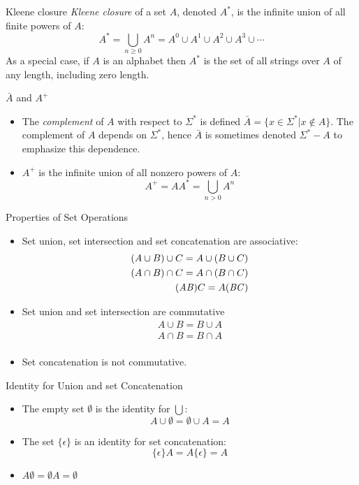 \documentclass[style=sailor,size=12pt]{powerdot}
\begin{document}
\begin{slide}[bm=,toc=]{Kleene closure}
\emph{Kleene closure} of a set $A$, denoted $A^*$, is the infinite union of all
finite powers of $A$:
\[
A^* = \bigcup_{n \geq 0} A^n = A^0 \cup A^1 \cup A^2 \cup A^3 \cup \cdots
\]
As a special case, if $A$ is an alphabet then $A^*$ is the set of all strings
over $A$ of any length, including zero length.
\end{slide}

\begin{slide}[bm=,toc=]{$\bar{A}$ and $A^+$}
\begin{itemize}
   \item The \emph{complement} of $A$ with respect to $\Sigma^*$ is defined 
         $\bar{A} = \{x \in \Sigma^* | x \notin A\}$. The complement of $A$
         depends on $\Sigma^*$, hence $\bar{A}$ is sometimes denoted 
         $\Sigma^* - A$ to emphasize this dependence.
   \item $A^+$ is the infinite union of all nonzero powers of $A$:
         \[
           A^+ = AA^* = \bigcup_{n>0} A^n
           \]
\end{itemize}
\end{slide}




\begin{slide}[bm=,toc=]{Properties of Set Operations}
\begin{itemize}
   \item Set union, set intersection and set concatenation are associative: 
   \[
     \begin{split}
     (A\cup B) \cup C = A \cup (B \cup C) \\
     (A\cap B) \cap C = A \cap (B \cap C) \\
     (\mathit{AB})C = A(\mathit{BC}) \\
     \end{split}
     \]
   \item Set union and set intersection are commutative
   \[
     \begin{split}
     A\cup B = B \cup A \\
     A\cap B = B \cap A \\
     \end{split}
    \]
    \item Set concatenation is not commutative.
\end{itemize}
\end{slide}

\begin{slide}[bm=,toc=]{Identity for Union and set Concatenation}
\begin{itemize}
   \item The empty set $\emptyset$ is the identity for $\bigcup$:
   \[
     A\cup \emptyset = \emptyset \cup A = A
     \]
   \item The set $\{\epsilon\}$ is an identity for set concatenation:
       \[
         \{\epsilon\}A = A\{\epsilon\} = A
       \]
   \item $A\emptyset = {\emptyset}A = \emptyset$
\end{itemize}
\end{slide}
\end{document}
